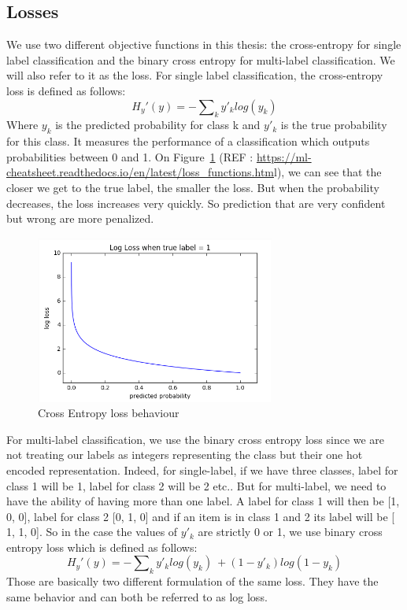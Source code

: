 \subsection{Losses}
We use two different objective functions in this thesis: the cross-entropy for single label classification and the binary cross entropy for multi-label classification. We will also refer to it as the loss. 
For single label classification, the cross-entropy loss is defined as follows: \[H_y'(y) = - \sum\nolimits_k y'_k log(y_k)\] Where \(y_k\) is the predicted probability for class k and \(y'_k\) is the true probability for this class. It measures the performance of a classification which outputs probabilities between 0 and 1. On  Figure~\ref{fig:CE} (REF : \url{https://ml-cheatsheet.readthedocs.io/en/latest/loss_functions.htm}l), we can see that the closer we get to the true label, the smaller the loss. But when the probability decreases, the loss increases very quickly. So prediction that are very confident but wrong are more penalized.
\begin{figure}[!htp]
    \centering
        \includegraphics[width=0.7\textwidth]{./figures/02-cross_entropy}
        \caption{Cross Entropy loss behaviour}\label{fig:CE}
\end{figure}


For multi-label classification, we use the binary cross entropy loss since we are not treating our labels as integers representing the class but their one hot encoded representation. Indeed, for single-label, if we have three classes, label for class 1 will be 1, label for class 2 will be 2 etc.. But for multi-label, we need to have the ability of having more than one label. A label for class 1 will then be [1, 0, 0], label for class 2 [0, 1, 0] and if an item is in class 1 and 2 its label will be [ 1, 1, 0]. So in the case the values of \(y'_k\) are strictly 0 or 1, we use binary cross entropy loss which is defined as follows: \[H_y'(y) = - \sum\nolimits_k y'_k log(y_k)\ + (1 - y'_k)log(1 - y_k) \]
Those are basically two different formulation of the same loss. They have the same behavior and can both be referred to as log loss. 
